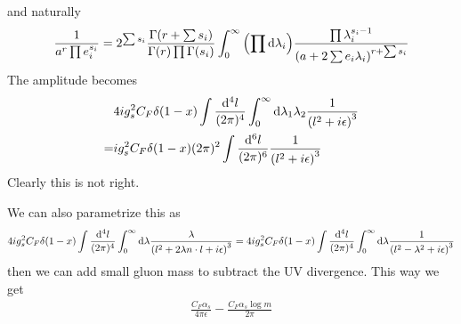 \documentclass{article}
\newcommand{\mm}[1]{\frac{\dd^4#1}{(2\pi)^4}}
\newcommand{\mmd}[2][d]{\ifthenelse{\equal{#1}{1}}{\frac{\dd {#2}}{2\pi}}{\frac{\dd^{#1}{#2}}{(2\pi)^{#1}}}}
\begin{document}
and naturally
\begin{align}
	\frac{1}{a^r\prod e_i^{s_i}}=2^{\sum s_i}\frac{\Gamma(r+\sum s_i)}{\Gamma(r)\prod\Gamma(s_i)}\int_0^\infty\pqty{\prod\dd \lambda_i}\frac{\prod \lambda_i^{s_i-1}}{\pqty{a+2\sum e_i\lambda_i}^{r+\sum s_i}}
\end{align}
The amplitude becomes
\begin{align}
	  & 4ig_s^2C_F\delta(1-x)\int\mm{l}\int_0^\infty\dd\lambda_1\lambda_2\frac{1}{\pqty{l^2+i\epsilon}^3} \\
	= & ig_s^2C_F\delta(1-x)(2\pi)^2\int\mmd[6]{l}\frac{1}{\pqty{l^2+i\epsilon}^3}
\end{align}
Clearly this is not right.

We can also parametrize this as
\begin{align}
	4ig_s^2C_F\delta(1-x)\int\mm{l}\int_0^\infty\dd\lambda\frac{\lambda}{\pqty{l^2+2\lambda n\cdot l+i\epsilon}^3}=4ig_s^2C_F\delta(1-x)\int\mm{l}\int_0^\infty\dd\lambda\frac{1}{\pqty{l^2-\lambda^2+i\epsilon}^3}
\end{align}
then we can add small gluon mass to subtract the UV divergence. This way we get
\begin{align}
	\frac{C_F \alpha _s}{4 \pi  \epsilon }-\frac{C_F \alpha _s \log{m}}{2 \pi }
\end{align}
\end{document}
